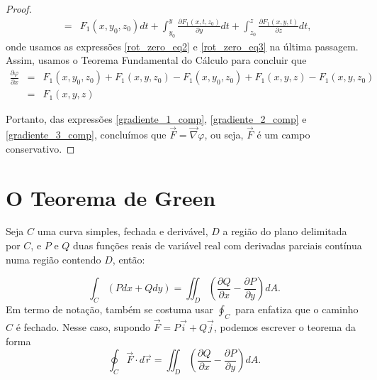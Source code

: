 \begin{proof}
\begin{eqnarray*}
&=&F_1(x,y_0,z_0) d t+ \int_{y_0}^y \frac{\partial F_1(x,t,z_0)}{\partial y}dt+ \int_{z_0}^z \frac{\partial F_1(x,y,t)}{\partial z}dt,
\end{eqnarray*}
onde usamos as expressões \eqref{rot_zero_eq2} e \eqref{rot_zero_eq3} na última passagem. Assim, usamos o Teorema Fundamental do Cálculo para concluir que
\begin{eqnarray}
\nonumber \frac{\partial \varphi}{\partial x}&=&F_1(x,y_0,z_0)+F_1(x,y,z_0)-F_1(x,y_0,z_0)+F_1(x,y,z)-F_1(x,y,z_0)\\
&=&F_1(x,y,z)\label{gradiente_1_comp}
\end{eqnarray}

Portanto, das expressões \eqref{gradiente_1_comp}, \eqref{gradiente_2_comp} e \eqref{gradiente_3_comp}, concluímos que $\vec{F}=\vec{\nabla}\varphi$, ou seja, $\vec{F}$ é um campo conservativo.
\end{proof}


\section{O Teorema de Green}
\begin{teo}
 Seja $C$ uma curva simples, fechada e derivável, $D$ a região do plano delimitada por $C$, e $P$ e $Q$ duas funções reais de variável real com derivadas parciais contínua numa região contendo $D$, então:

$$\int_{C} (P dx + Q dy) = \iint_{D} \left(\frac{\partial Q}{\partial x} - \frac{\partial P}{\partial
y}\right) dA.
$$
Em termo de notação, também se costuma usar $\oint_C$ para enfatiza que o caminho $C$ é fechado. Nesse caso, supondo $\vec{F}=P\vec{i}+Q\vec{j}$, podemos escrever o teorema da forma
$$
\oint_C  \vec{F} \cdot d\vec{r}=\iint_{D} \left(\frac{\partial Q}{\partial x} - \frac{\partial P}{\partial
y}\right) dA.
$$
\end{teo}


